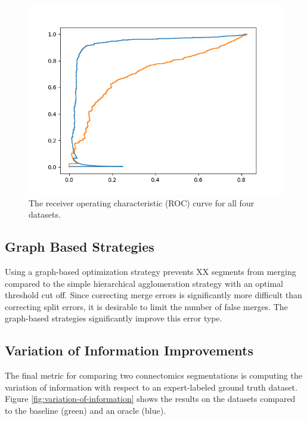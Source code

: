\begin{figure}
	\includegraphics[width=0.9\linewidth]{./figures/roc-microns-300-test.png}
	\caption{The receiver operating characteristic (ROC) curve for all four datasets.}
	\label{fig:network-results}
\end{figure}

\subsection{Graph Based Strategies}

Using a graph-based optimization strategy prevents XX segments from merging compared to the simple hierarchical agglomeration strategy with an optimal threshold cut off. Since correcting merge errors is significantly more difficult than correcting split errors, it is desirable to limit the number of false merges. The graph-based strategies significantly improve this error type. 

\subsection{Variation of Information Improvements}

The final metric for comparing two connectomics segmentations is computing the variation of information with respect to an expert-labeled ground truth dataset. Figure \ref{fig:variation-of-information} shows the results on the datasets compared to the baseline (green) and an oracle (blue). 

